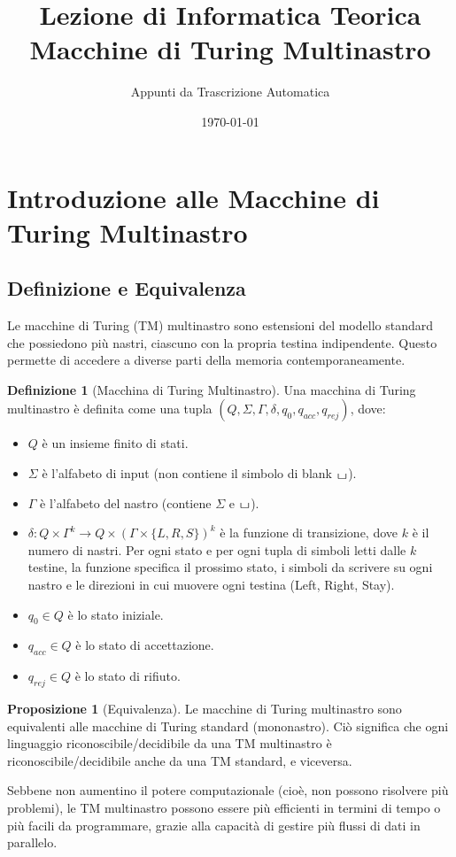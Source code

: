 \documentclass[a4paper]{article}
\title{Lezione di Informatica Teorica\\{\Large Macchine di Turing Multinastro}}
\author{Appunti da Trascrizione Automatica}
\date{\today}
\theoremstyle{definition} %
\newtheorem{definition}{Definizione}
\newtheorem{proposition}{Proposizione}
\newcommand{\blankS}{\ensuremath{\raisebox{-0.15ex}{\scalebox{1.3}[0.7]{$\sqcup$}}}}
\begin{document}
\maketitle
\tableofcontents
\newpage

\section{Introduzione alle Macchine di Turing Multinastro}

\subsection{Definizione e Equivalenza}
Le macchine di Turing (TM) multinastro sono estensioni del modello standard che possiedono più nastri, ciascuno con la propria testina indipendente. Questo permette di accedere a diverse parti della memoria contemporaneamente.

\begin{definition}[Macchina di Turing Multinastro]
Una macchina di Turing multinastro è definita come una tupla $(Q, \Sigma, \Gamma, \delta, q_0, q_{acc}, q_{rej})$, dove:
\begin{itemize}
    \item $Q$ è un insieme finito di stati.
    \item $\Sigma$ è l'alfabeto di input (non contiene il simbolo di blank $\blankS$).
    \item $\Gamma$ è l'alfabeto del nastro (contiene $\Sigma$ e $\blankS$).
    \item $\delta: Q \times \Gamma^k \to Q \times (\Gamma \times \{L, R, S\})^k$ è la funzione di transizione, dove $k$ è il numero di nastri. Per ogni stato e per ogni tupla di simboli letti dalle $k$ testine, la funzione specifica il prossimo stato, i simboli da scrivere su ogni nastro e le direzioni in cui muovere ogni testina (Left, Right, Stay).
    \item $q_0 \in Q$ è lo stato iniziale.
    \item $q_{acc} \in Q$ è lo stato di accettazione.
    \item $q_{rej} \in Q$ è lo stato di rifiuto.
\end{itemize}
\end{definition}

\begin{proposition}[Equivalenza]
Le macchine di Turing multinastro sono equivalenti alle macchine di Turing standard (mononastro). Ciò significa che ogni linguaggio riconoscibile/decidibile da una TM multinastro è riconoscibile/decidibile anche da una TM standard, e viceversa.
\end{proposition}
Sebbene non aumentino il potere computazionale (cioè, non possono risolvere più problemi), le TM multinastro possono essere più efficienti in termini di tempo o più facili da programmare, grazie alla capacità di gestire più flussi di dati in parallelo.
\end{document}
